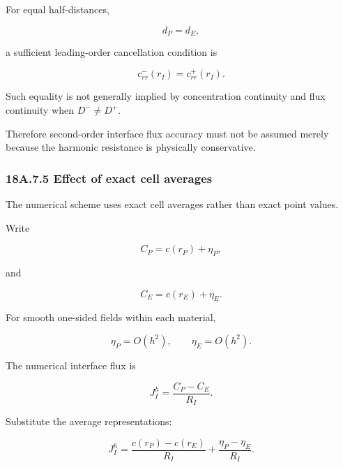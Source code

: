 \documentclass[11pt,a4paper]{article}
\begin{document}
For equal half-distances,

\begin{equation}
d_P=d_E,
\tag{TRISO-ACC-200}
\label{eq:triso-acc-200}
\end{equation}

a sufficient leading-order cancellation condition is

\begin{equation}
c_{rr}^-(r_I)
=
c_{rr}^+(r_I).
\tag{TRISO-ACC-201}
\label{eq:triso-acc-201}
\end{equation}

Such equality is not generally implied by concentration continuity and flux continuity when $D^-\ne D^+$.

Therefore second-order interface flux accuracy must not be assumed merely because the harmonic resistance is physically conservative.

\subsubsection*{18A.7.5 Effect of exact cell averages}

The numerical scheme uses exact cell averages rather than exact point values.

Write

\begin{equation}
C_P=c(r_P)+\eta_P,
\tag{TRISO-ACC-202}
\label{eq:triso-acc-202}
\end{equation}

and

\begin{equation}
C_E=c(r_E)+\eta_E.
\tag{TRISO-ACC-203}
\label{eq:triso-acc-203}
\end{equation}

For smooth one-sided fields within each material,

\begin{equation}
\eta_P=O(h^2),
\qquad
\eta_E=O(h^2).
\tag{TRISO-ACC-204}
\label{eq:triso-acc-204}
\end{equation}

The numerical interface flux is

\begin{equation}
J_I^h
=
\frac{
C_P-C_E
}{
R_I
}.
\tag{TRISO-ACC-205}
\label{eq:triso-acc-205}
\end{equation}

Substitute the average representations:

\begin{equation}
J_I^h
=
\frac{
c(r_P)-c(r_E)
}{
R_I
}
+
\frac{
\eta_P-\eta_E
}{
R_I
}.
\tag{TRISO-ACC-206}
\label{eq:triso-acc-206}
\end{equation}
\end{document}
